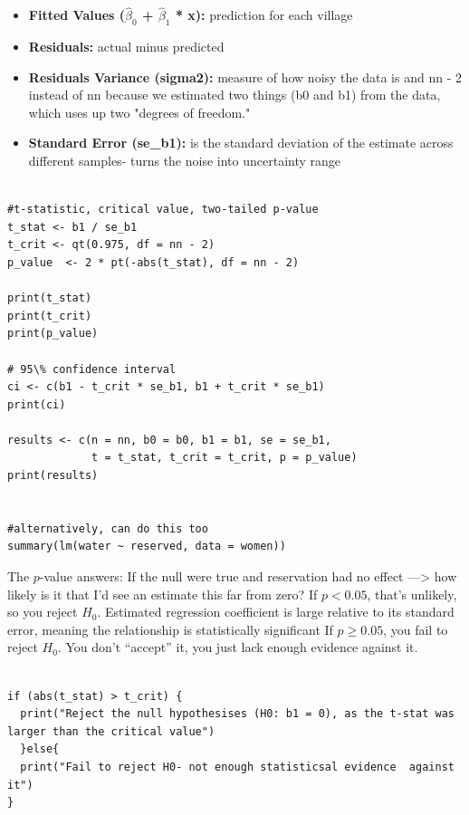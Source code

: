 \documentclass[11pt]{article}
\begin{document}
\begin{itemize}
  \item \textbf{Fitted Values ($\hat\beta_0$ + $\hat\beta_1$ * x):} prediction for each village 
  \item \textbf{Residuals:} actual minus predicted
  \item \textbf{Residuals Variance (sigma2):} measure of how noisy the data is and nn - 2 instead of nn because we estimated two things (b0 and b1) from the data, which uses up two "degrees of freedom."
  \item \textbf{Standard Error (se\_b1):} is the standard deviation of the estimate across different samples- turns the noise into uncertainty range
\end{itemize}

\begin{lstlisting}

#t-statistic, critical value, two-tailed p-value
t_stat <- b1 / se_b1
t_crit <- qt(0.975, df = nn - 2)
p_value  <- 2 * pt(-abs(t_stat), df = nn - 2)

print(t_stat)
print(t_crit)
print(p_value)

# 95\% confidence interval
ci <- c(b1 - t_crit * se_b1, b1 + t_crit * se_b1)
print(ci)

results <- c(n = nn, b0 = b0, b1 = b1, se = se_b1,
             t = t_stat, t_crit = t_crit, p = p_value)
print(results)


#alternatively, can do this too 
summary(lm(water ~ reserved, data = women))

\end{lstlisting}

The $p$-value answers: If the null were true and reservation had no effect ---> how likely is it that I'd see an estimate this far from zero?
If $p < 0.05$, that's unlikely, so you reject $H_0$. Estimated regression coefficient is large relative to its standard error, meaning the relationship is statistically significant
If $p \geq 0.05$, you fail to reject $H_0$. You don't ``accept'' it, you just lack enough evidence against it.

\begin{lstlisting}

if (abs(t_stat) > t_crit) {
  print("Reject the null hypothesises (H0: b1 = 0), as the t-stat was larger than the critical value")
  }else{
  print("Fail to reject H0- not enough statisticsal evidence  against it")
}
\end{lstlisting}
\end{document}
